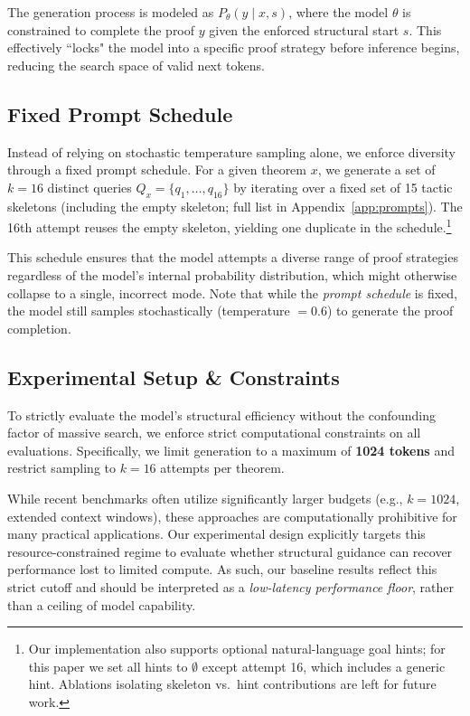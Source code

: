 \documentclass{article}
\begin{document}
The generation process is modeled as $P_{\theta}(y \mid x, s)$, where the model $\theta$ is constrained to complete the proof $y$ given the enforced structural start $s$. This effectively ``locks" the model into a specific proof strategy before inference begins, reducing the search space of valid next tokens.

\subsection{Fixed Prompt Schedule}
Instead of relying on stochastic temperature sampling alone, we enforce diversity through a fixed prompt schedule. For a given theorem $x$, we generate a set of $k=16$ distinct queries $Q_x = \{q_1, \dots, q_{16}\}$ by iterating over a fixed set of 15 tactic skeletons (including the empty skeleton; full list in Appendix~\ref{app:prompts}). The 16th attempt reuses the empty skeleton, yielding one duplicate in the schedule.\footnote{Our implementation also supports optional natural-language goal hints; for this paper we set all hints to $\emptyset$ except attempt 16, which includes a generic hint. Ablations isolating skeleton vs.\ hint contributions are left for future work.}

This schedule ensures that the model attempts a diverse range of proof strategies regardless of the model's internal probability distribution, which might otherwise collapse to a single, incorrect mode. Note that while the \textit{prompt schedule} is fixed, the model still samples stochastically (temperature $= 0.6$) to generate the proof completion.

\subsection{Experimental Setup \& Constraints}
\label{sec:constraints}
To strictly evaluate the model's structural efficiency without the confounding factor of massive search, we enforce strict computational constraints on all evaluations. Specifically, we limit generation to a maximum of \textbf{1024 tokens} and restrict sampling to $k=16$ attempts per theorem.

While recent benchmarks often utilize significantly larger budgets (e.g., $k=1024$, extended context windows), these approaches are computationally prohibitive for many practical applications. Our experimental design explicitly targets this resource-constrained regime to evaluate whether structural guidance can recover performance lost to limited compute. As such, our baseline results reflect this strict cutoff and should be interpreted as a \textit{low-latency performance floor}, rather than a ceiling of model capability.
\end{document}
